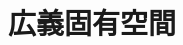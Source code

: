 \documentclass[../../topic_linear-algebra]{subfiles}
\begin{document}
\chapter{広義固有空間}
\end{document}
